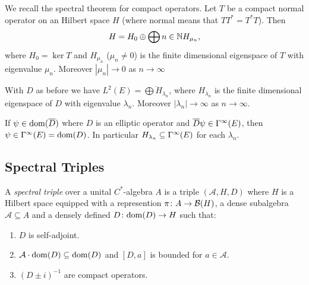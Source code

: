 \begin{remark}
 We recall the spectral theorem for compact operators. Let $T$ be a compact normal operator on an Hilbert space $H$ (where normal means that $TT^\ast=T^\ast T$). Then $$H=H_0\oplus\bigoplus{n\in\mathbb{N}}H_{\mu_n},$$
 where $H_0=\ker T$ and $H_{\mu_n}$ ($\mu_n\neq 0$) is the finite dimensional eigenspace of $T$ with eigenvalue $\mu_n$. Moreover $|\mu_n|\to 0$ as $n\to\infty$ 
\end{remark}
\begin{corollary}
 With $D$ as before  we have $L^2(E)=\overline{\bigoplus H_{\lambda_n}}$, where $H_{\lambda_n}$ is the finite dimensional eigenspace of $D$ with eigenvalue $\lambda_n$. Moreover $|\lambda_n|\to\infty$ as $n\to\infty$.
\end{corollary}
\begin{theorem} If $\psi\in\mathrm{dom}(\overline{D})$ where $D$ is an elliptic operator and $\overline{D}\psi\in\Gamma^\infty(E)$, then $\psi\in\Gamma^\infty(E)=\mathrm{dom}(D)$. In particular $H_{\lambda_n}\subseteq\Gamma^\infty(E)$ for each $\lambda_n$.
\end{theorem}
\subsection{Spectral Triples}
\begin{definition}
 A \emph{spectral triple} over a unital $C^\ast$-algebra $A$ is a triple $(\mathcal A,H,D)$ where $H$ is a Hilbert space equipped with a represention $\pi\colon A\to\mathcal{B}(H)$, a dense subalgebra $\mathcal A\subseteq A$ and a densely defined $D\colon\mathrm{dom}(D)\to H$ such that: 
 \begin{enumerate}
  \item $D$ is self-adjoint.
  \item $\mathcal A\cdot\mathrm{dom}(D)\subseteq\mathrm{dom}(D)$ and $[D,a]$ is bounded for $a\in\mathcal A$.
  \item $(D\pm i)^{-1}$ are compact operators.
 \end{enumerate}

\end{definition}










